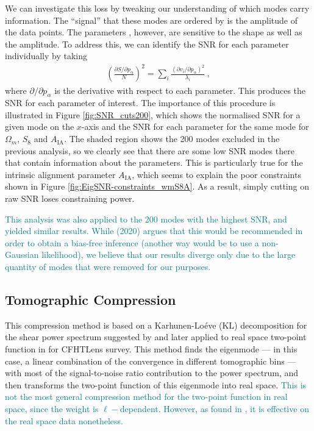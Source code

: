 \documentclass[twocolumn]{\docclass}
\newcommand{\rf}[1]{Figure \ref{fig:#1}}
\def\bea{\begin{eqnarray}}
\def\eea{\end{eqnarray}}
\begin{document}
	We can investigate this loss by tweaking our understanding of which modes carry information. The ``signal'' that these modes are ordered by is the amplitude of the data points.  The parameters , however, are sensitive to the shape as well as the amplitude.
	To address this, we can identify the SNR for each parameter individually by taking
	\bea
	\left(\frac{\partial S/\partial p_\alpha}{N}\right)^2 = \sum_{i} \frac{(\partial v_i / \partial p_\alpha)^2}{\lambda_i}\
	,\eea
	where $\partial /\partial p_\alpha$ is the derivative with respect to each parameter. This produces the SNR for each parameter of interest. The importance of this procedure is illustrated in \rf{SNR_cuts200}, which shows the normalised SNR for a given mode on the $x$-axis and the SNR for each parameter for the same mode for $\Omega_m$, $S_8$ and $A_{\mathrm{IA}}$. The shaded region shows the 200 modes excluded in the previous analysis, so we clearly see that there are some low SNR modes there that contain information about the parameters. This is particularly true for the intrinsic alignment parameter $A_{\mathrm{IA}}$, which seems to explain the poor constraints shown in \rf{EigSNR-constraints_wmS8A}. As a result, simply cutting on raw SNR loses constraining power.
	
	\textcolor{teal}{This analysis was also applied to the 200 modes with the highest SNR, and yielded similar results. While \citeauthor{Louca:2020} (2020) argues that this would be recommended in order to obtain a bias-free inference (another way would be to use a non-Gaussian likelihood), we believe that our results diverge only due to the large quantity of modes that were removed for our purposes.}
	
	\subsection{Tomographic Compression}
	\label{subsec:tomographic_compression}
	
	This compression method is based on a Karhunen-Lo\'eve (KL) decomposition for the shear power spectrum suggested by \citep{Alonso:2017hhj} and later applied to real space two-point function in \citep{Bellini:2019ssw} for CFHTLens survey. This method finds the eigenmode --- in this case, a linear combination of the convergence in different tomographic bins --- with most of the signal-to-noise ratio contribution to the power spectrum, and then transforms the two-point function of this eigenmode into real space. \textcolor{teal}{This is not the most general compression method for the two-point function in real space, since the weight is $\ell-$dependent. However, as found in \citep{Bellini:2019ssw}, it is effective on the real space data nonetheless.}
	
\end{document}
